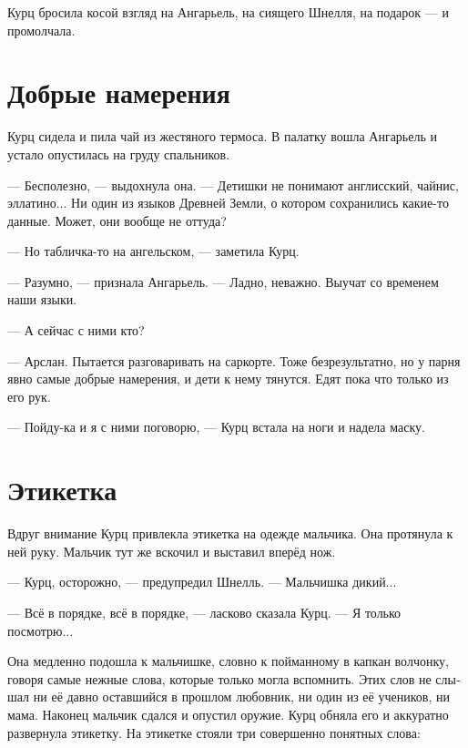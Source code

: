 \documentclass[a4paper,12pt,fleqn]{book}\usepackage{polyglossia}\setdefaultlanguage[babelshorthands=true]{russian}\setotherlanguage{english}\defaultfontfeatures{Ligatures=TeX,Mapping=tex-text}\usepackage{xcolor}\newcommand{\ml}[3]{#2}
\newcommand{\Arythlan}{Aryþlan}
\begin{document}
Курц бросила косой взгляд на Ангарьель, на сиящего Шнелля, на подарок --- и промолчала.

\section{Добрые намерения}

Курц сидела и пила чай из жестяного термоса.
В палатку вошла Ангарьель и устало опустилась на груду спальников.

--- Бесполезно, --- выдохнула она.
\ml{$0$}
{--- Детишки не понимают англисский, чайнис, эллатино...}
{``The children don't speak Englis, Chainis, Ellatino ....}
Ни один из языков Древней Земли, о котором сохранились какие-то данные.
Может, они вообще не оттуда?

\ml{$0$}
{--- Но табличка-то на ангельском, --- заметила Курц.}
{``But that plate is written in Engels,'' Kurz noted.}

\ml{$0$}
{--- Разумно, --- признала Ангарьель.}
{``Makes sense,'' Angariel admitted.}
--- Ладно, неважно.
Выучат со временем наши языки.

--- А сейчас с ними кто?

\ml{$0$}
{--- Арслан.}
{``\Arythlan.}
\ml{$0$}
{Пытается разговаривать на саркорте.}
{Trying to speak Sarqort to them.}
\ml{$0$}
{Тоже безрезультатно, но у парня явно самые добрые намерения, и дети к нему тянутся.}
{Result is the same, but the guy apparently has the best intentions for them, and the children reciprocate.}
\ml{$0$}
{Едят пока что только из его рук.}
{Thus far, they take food from his hands only.''}

--- Пойду-ка и я с ними поговорю, --- Курц встала на ноги и надела маску.

\section{Этикетка}

Вдруг внимание Курц привлекла этикетка на одежде мальчика.
Она протянула к ней руку.
Мальчик тут же вскочил и выставил вперёд нож.

--- Курц, осторожно, --- предупредил Шнелль.
--- Мальчишка дикий...

--- Всё в порядке, всё в порядке, --- ласково сказала Курц.
--- Я только посмотрю...

Она медленно подошла к мальчишке, словно к пойманному в капкан волчонку, говоря самые нежные слова, которые только могла вспомнить.
Этих слов не слышал ни её давно оставшийся в прошлом любовник, ни один из её учеников, ни мама.
Наконец мальчик сдался и опустил оружие.
Курц обняла его и аккуратно развернула этикетку.
На этикетке стояли три совершенно понятных слова:
\end{document}
